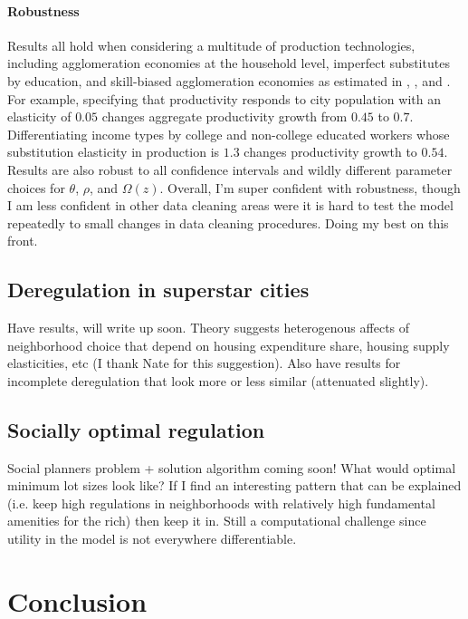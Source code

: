 \documentclass[11pt]{article}
\begin{document}
\paragraph*{Robustness} Results all hold when considering a multitude of production technologies, including agglomeration economies at the household level, imperfect substitutes by education, and skill-biased agglomeration economies as estimated in \cite{diamond2016}, \cite{card}, and \cite{Combes_review}. For example, specifying that productivity responds to city population with an elasticity of $0.05$ changes aggregate productivity growth from $0.45$ to $0.7$. Differentiating income types by college and non-college educated workers whose substitution elasticity in production is $1.3$ \cite{card} changes productivity growth to $0.54$. Results are also robust to all confidence intervals and wildly different parameter choices for $\theta$, $\rho$, and $\Omega(z)$. Overall, I'm super confident with robustness, though I am less confident in other data cleaning areas were it is hard to test the model repeatedly to small changes in data cleaning procedures. Doing my best on this front. 

\subsection{Deregulation in superstar cities}
Have results, will write up soon. Theory suggests heterogenous affects of neighborhood choice that depend on housing expenditure share, housing supply elasticities, etc (I thank Nate for this suggestion). Also have results for incomplete deregulation that look more or less similar (attenuated slightly). 

\subsection{Socially optimal regulation}
Social planners problem + solution algorithm coming soon! What would optimal minimum lot sizes look like? If I find an interesting pattern that can be explained (i.e. keep high regulations in neighborhoods with relatively high fundamental amenities for the rich) then keep it in. Still a computational challenge since utility in the model is not everywhere differentiable. 


\section{Conclusion}

	\newpage\newpage
	\scriptsize
	
	
\end{document}
